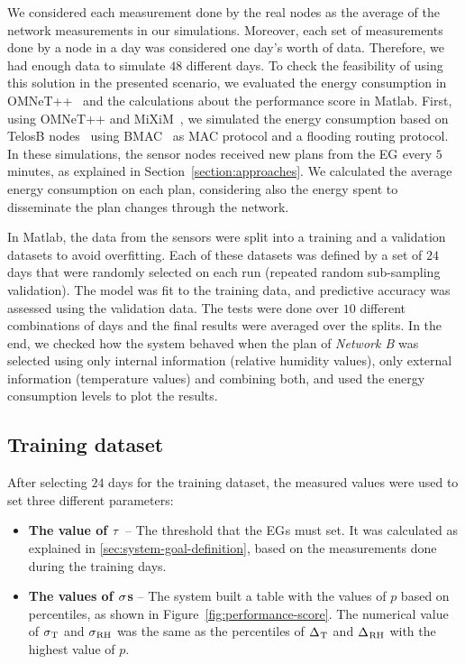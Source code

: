 \documentclass{llncs}
\newcommand{\EG}[1]{EG$_{\text{#1}}$}
\newcommand{\ourDelta}[2][]{\ensuremath{\Delta\textsuperscript{\text{#1}}
\textsubscript{\text{#2}}}}
\newcommand{\threshold}[1][]{\ensuremath{\tau\textsubscript{#1}}}
\newcommand{\symptom}[1][]{\ensuremath{\sigma\textsubscript{#1}}}
\begin{document}
We considered each measurement done by the real nodes as the average of the 
network measurements in our simulations. 
Moreover, each set of measurements done by a node in a day was considered one 
day's worth of data. Therefore, we had enough data to simulate $48$ different 
days.
To check the feasibility of using this solution in the presented 
scenario, we evaluated the energy consumption in OMNeT++~\cite{Varga2001} and 
the calculations about the performance score in Matlab.
First, using OMNeT++ and MiXiM~\cite{Kopke}, we simulated the energy 
consumption based on TelosB nodes~\cite{Platform} using BMAC~\cite{Fakih2006} as 
MAC protocol and a flooding routing protocol. 
In these simulations, the sensor nodes received new plans from the \EG{} every 
$5$ minutes, as explained in Section~\ref{section:approaches}. We calculated 
the average energy consumption on each plan, considering also the energy spent 
to disseminate the plan changes through the network. 

In Matlab, the data from the sensors were split into a training and a validation 
datasets to avoid overfitting. Each of these datasets was defined by a set of 
$24$ days that were randomly selected on each run (repeated random sub-sampling 
validation). The model was fit to the training data, and predictive accuracy was 
assessed using the validation data. The tests were done over $10$ different 
combinations of days and the final results were averaged over the splits. In the 
end, we checked how the system behaved when the plan of \emph{Network B} was 
selected using only internal information (relative humidity values), only 
external information (temperature values) and combining both, and used the 
energy consumption levels to plot the results. 

\subsection{Training dataset}

After selecting $24$ days for the training dataset, the measured values were 
used to set three different parameters: 

\begin{itemize}
 \item \textbf{The value of \threshold{}} -- The threshold that the 
\EG{}s must set. It was calculated as explained in 
\ref{sec:system-goal-definition}, based on the measurements done during the 
training days.
 \item \textbf{The values of \symptom{}s} -- The system built a table with the 
values of $p$ based on percentiles, as shown in 
Figure~\ref{fig:performance-score}. The 
numerical value of \symptom[T] and \symptom[RH] was the same as the 
percentiles of \ourDelta{T} and \ourDelta{RH}  with the highest value 
of $p$.
\end{itemize}
\end{document}
